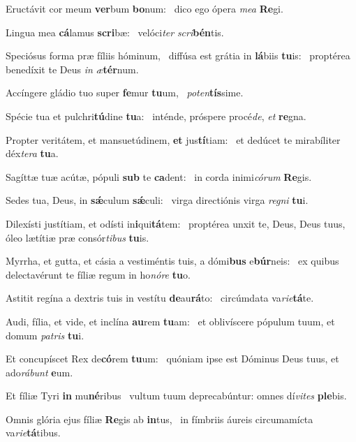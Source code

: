 \item Eructávit cor meum \textbf{ver}bum \textbf{bo}num:~\psstar{} dico ego ópera \textit{mea} \textbf{Re}gi.
\item Lingua mea \textbf{cá}lamus \textbf{scri}bæ:~\psstar{} velóci\textit{ter} \textit{scri}\textbf{bén}tis.
\item Speciósus forma præ fíliis hóminum,~\pscross{} diffúsa est grátia in \textbf{lá}biis \textbf{tu}is:~\psstar{} proptérea benedíxit te Deus \textit{in} \textit{æ}\textbf{tér}num.
\item Accíngere gládio tuo super \textbf{fe}mur \textbf{tu}um,~\psstar{} \textit{poten}\textbf{tís}sime.
\item Spécie tua et pulchri\textbf{tú}dine \textbf{tu}a:~\psstar{} inténde, próspere procé\textit{de}, \textit{et} \textbf{re}gna.
\item Propter veritátem, et mansuetúdinem, \textbf{et} jus\textbf{tí}tiam:~\psstar{} et dedúcet te mirabíliter déx\textit{tera} \textbf{tu}a.
\item Sagíttæ tuæ acútæ, pópuli \textbf{sub} te \textbf{ca}dent:~\psstar{} in corda inimi\textit{córum} \textbf{Re}gis.
\item Sedes tua, Deus, in \textbf{sǽ}culum \textbf{sǽ}culi:~\psstar{} virga directiónis virga \textit{regni} \textbf{tu}i.
\item Dilexísti justítiam, et odísti in\textbf{i}qui\textbf{tá}tem:~\psstar{} proptérea unxit te, Deus, Deus tuus, óleo lætítiæ præ consór\textit{tibus} \textbf{tu}is.
\item Myrrha, et gutta, et cásia a vestiméntis tuis, a dómi\textbf{bus} e\textbf{búr}neis:~\psstar{} ex quibus delectavérunt te fíliæ regum in ho\textit{nóre} \textbf{tu}o.
\item Astitit regína a dextris tuis in vestítu \textbf{de}au\textbf{rá}to:~\psstar{} circúmdata va\textit{rie}\textbf{tá}te.
\item Audi, fília, et vide, et inclína \textbf{au}rem \textbf{tu}am:~\psstar{} et oblivíscere pópulum tuum, et domum \textit{patris} \textbf{tu}i.
\item Et concupíscet Rex de\textbf{có}rem \textbf{tu}um:~\psstar{} quóniam ipse est Dóminus Deus tuus, et ado\textit{rábunt} \textbf{e}um.
\item Et fíliæ Tyri \textbf{in} mu\textbf{né}ribus~\psstar{} vultum tuum deprecabúntur: omnes dí\textit{vites} \textbf{ple}bis.
\item Omnis glória ejus fíliæ \textbf{Re}gis ab \textbf{in}tus,~\psstar{} in fímbriis áureis circumamícta va\textit{rie}\textbf{tá}tibus.
